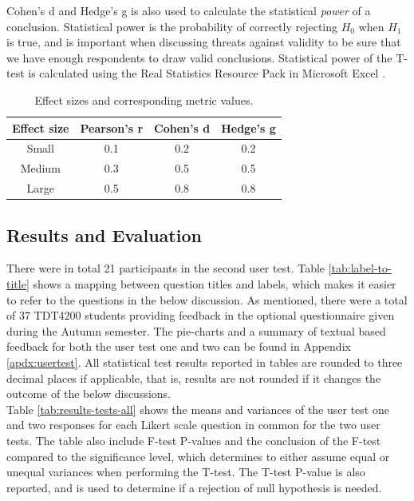 Cohen's d and Hedge's g is also used to calculate the statistical \textit{power} of a conclusion. Statistical power is the probability of correctly rejecting $H_0$ when $H_1$ is true, and is important when discussing threats against validity to be sure that we have enough respondents to draw valid conclusions. Statistical power of the T-test is calculated using the Real Statistics Resource Pack in Microsoft Excel \cite{RSRP}.

\begin{table}[t!]
    \centering
    \begin{tabular}{ | c | c | c | c |}
    \hline
    \textbf{Effect size} & \textbf{Pearson's r} & \textbf{Cohen's d} & \textbf{Hedge's g} \\ \hline
    Small & 0.1 & 0.2 & 0.2 \\ \hline
    Medium & 0.3 & 0.5 & 0.5 \\ \hline
    Large & 0.5 & 0.8 & 0.8 \\ \hline
    \end{tabular}
    \caption{Effect sizes and corresponding metric values.}
    \label{tab:effect-size}
\end{table}

\subsection{Results and Evaluation}
\label{sub-sec:user-testing-results}
There were in total 21 participants in the second user test. Table \ref{tab:label-to-title} shows a mapping between question titles and labels, which makes it easier to refer to the questions in the below discussion. As mentioned, there were a total of 37 TDT4200 students providing feedback in the optional questionnaire given during the Autumn semester. The pie-charts and a summary of textual based feedback for both the user test one and two can be found in Appendix \ref{apdx:usertest}. All statistical test results reported in tables are rounded to three decimal places if applicable, that is, results are not rounded if it changes the outcome of the below discussions. \\

Table \ref{tab:results-tests-all} shows the means and variances of the user test one and two responses for each Likert scale question in common for the two user tests. The table also include F-test P-values and the conclusion of the F-test compared to the significance level, which determines to either assume equal or unequal variances when performing the T-test. The T-test P-value is also reported, and is used to determine if a rejection of null hypothesis is needed. \\


